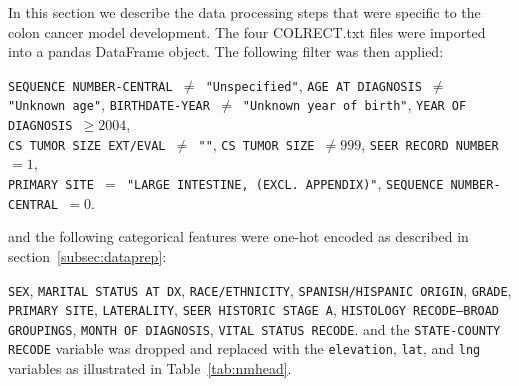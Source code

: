 \documentclass[a4paper,11pt]{article}
\newcommand{\code}[1]{\colorbox{light-gray}{\texttt{#1}}}
\begin{document}
In this section we describe the data processing steps that were specific to the colon cancer model development. The four COLRECT.txt files were imported into a pandas DataFrame object.
The following filter was then applied:



\code{SEQUENCE NUMBER-CENTRAL $\neq$ "Unspecified"},
 \code{AGE AT DIAGNOSIS $\neq$ "Unknown age"},
\code{BIRTHDATE-YEAR $\neq$ "Unknown year of birth"},
\code{YEAR OF DIAGNOSIS $\geq 2004$}, \\
 \code{CS TUMOR SIZE EXT/EVAL $\neq$ ""},
\code{CS TUMOR SIZE $\neq 999$},
\code{SEER RECORD NUMBER $= 1$}, \\
\code{PRIMARY SITE $=$ "LARGE INTESTINE, (EXCL. APPENDIX)"},
\code{SEQUENCE NUMBER-CENTRAL $= 0$}.

and the following categorical features were one-hot encoded as described in 
section~\ref{subsec:dataprep}:

\code{SEX},
 \code{MARITAL STATUS AT DX},
\code{RACE/ETHNICITY},
 \code{SPANISH/HISPANIC ORIGIN},
 \code{GRADE},
 \code{PRIMARY SITE},
\code{LATERALITY},
\code{SEER HISTORIC STAGE A},
\code{HISTOLOGY RECODE--BROAD GROUPINGS},
\code{MONTH OF DIAGNOSIS},
 \code{VITAL STATUS RECODE}.
and the \code{STATE-COUNTY RECODE} variable was dropped and replaced with the \code{elevation}, \code{lat}, and \code{lng} variables as illustrated in Table~\ref{tab:nmhead}.
\end{document}
